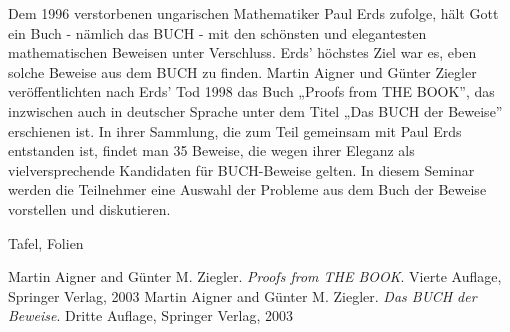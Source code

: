 \begin{course}
\begin{content}
Dem 1996 verstorbenen ungarischen Mathematiker Paul Erds zufolge, hält Gott ein Buch - nämlich das BUCH - mit den schönsten und elegantesten mathematischen Beweisen unter Verschluss. Erds' höchstes Ziel war es, eben solche Beweise aus dem BUCH zu finden. \newline
\newline
 Martin Aigner und Günter Ziegler veröffentlichten nach Erds' Tod 1998 das Buch „Proofs from THE BOOK”, das inzwischen auch in deutscher Sprache unter dem Titel „Das BUCH der Beweise” erschienen ist. In ihrer Sammlung, die zum Teil gemeinsam mit Paul Erds entstanden ist, findet man 35 Beweise, die wegen ihrer Eleganz als vielversprechende Kandidaten für BUCH-Beweise gelten. \newline
\newline
 In diesem Seminar werden die Teilnehmer eine Auswahl der Probleme aus dem Buch der Beweise vorstellen und diskutieren.


\end{content}

\begin{media}Tafel, Folien

\end{media}

\begin{literature}Martin Aigner and Günter M. Ziegler. \emph{Proofs from THE BOOK}. Vierte Auflage, Springer Verlag, 2003\newline
Martin Aigner and Günter M. Ziegler. \emph{Das BUCH der Beweise}. Dritte Auflage, Springer Verlag, 2003

\end{literature}



\end{course}